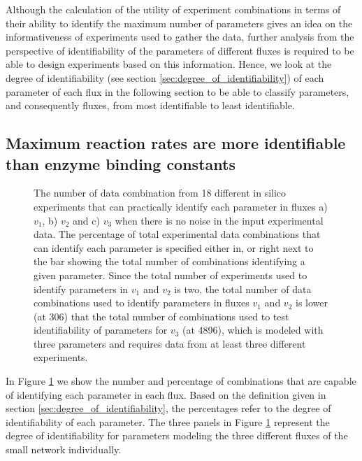 \documentclass[10pt]{article}
\begin{document}
	Although the calculation of the utility of experiment combinations in terms of their ability to identify the maximum number of parameters gives an idea on the informativeness of experiments used to gather the data, further analysis from the perspective of identifiability of the parameters of different fluxes is required to be able to design experiments based on this information. Hence, we look at the degree of identifiability (see section \ref{sec:degree_of_identifiability}) of each parameter of each flux in the following section to be able to classify parameters, and consequently fluxes, from most identifiable to least identifiable.
	
	\subsection{Maximum reaction rates are more identifiable than enzyme binding constants}\label{sec:trends}
	\begin{figure}[!tbhp]
		\caption{The number of data combination from 18 different in silico experiments that can practically identify each parameter in fluxes a) $v_1$, b) $v_2$ and c) $v_3$ when there is no noise in the input experimental data. The percentage of total experimental data combinations that can identify each parameter is specified either in, or right next to the bar showing the total number of combinations identifying a given parameter. Since the total number of experiments used to identify parameters in $v_1$ and $v_2$ is two, the total number of data combinations used to identify parameters in fluxes $v_1$ and $v_2$ is lower (at 306) that the total number of combinations used to test identifiability of parameters for $v_3$ (at 4896), which is modeled with three parameters and requires data from at least three different experiments.}\label{fig:figure1}
	\end{figure}
	In Figure \ref{fig:figure1} we show the number and percentage of combinations that are capable of identifying each parameter in each flux. Based on the definition given in section \ref{sec:degree_of_identifiability}, the percentages refer to the degree of identifiability of each parameter. The three panels in Figure \ref{fig:figure1} represent the degree of identifiability for parameters modeling the three different fluxes of the small network individually. 
	
\end{document}
